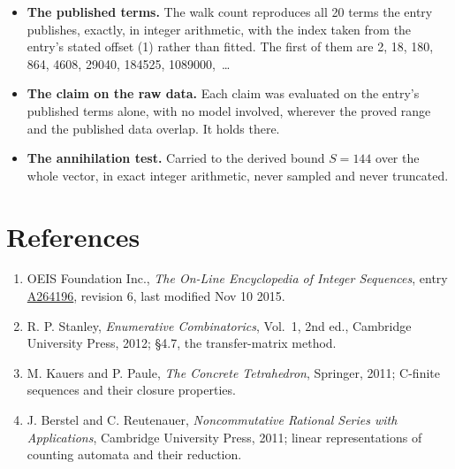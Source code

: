 \documentclass[11pt]{article}
\theoremstyle{definition}
\begin{document}
\begin{itemize}

\item {\bfseries The published terms.} The walk count reproduces all 20 terms the entry publishes, exactly, in integer arithmetic, with the index taken from the entry's stated offset (1) rather than fitted. The first of them are 2, 18, 180, 864, 4608, 29040, 184525, 1089000,~\dots

\item {\bfseries The claim on the raw data.} Each claim was evaluated on the entry's published terms alone, with no model involved, wherever the proved range and the published data overlap. It holds there.

\item {\bfseries The annihilation test.} Carried to the derived bound $S = 144$ over the whole vector, in exact integer arithmetic, never sampled and never truncated.

\end{itemize}

\section{References}

\begin{enumerate}

\item OEIS Foundation Inc., \emph{The On-Line Encyclopedia of Integer Sequences}, entry \href{https://oeis.org/A264196}{A264196}, revision 6, last modified Nov 10 2015.

\item R. P. Stanley, \emph{Enumerative Combinatorics}, Vol.~1, 2nd ed., Cambridge University Press, 2012; \S4.7, the transfer-matrix method.

\item M. Kauers and P. Paule, \emph{The Concrete Tetrahedron}, Springer, 2011; C-finite sequences and their closure properties.

\item J. Berstel and C. Reutenauer, \emph{Noncommutative Rational Series with Applications}, Cambridge University Press, 2011; linear representations of counting automata and their reduction.

\end{enumerate}
\end{document}

